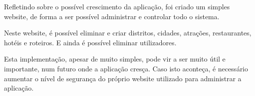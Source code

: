Refletindo sobre o possível crescimento da aplicação, foi criado um simples website, de forma a ser possível administrar e controlar todo o sistema.

Neste website, é possível eliminar e criar distritos, cidades, atrações, restaurantes, hotéis e roteiros. E ainda é possível eliminar utilizadores.

Esta implementação, apesar de muito simples, pode vir a ser muito útil e importante, num futuro onde a aplicação cresça. Caso isto aconteça, é necessário aumentar o nível de segurança do próprio website utilizado para administrar a aplicação.